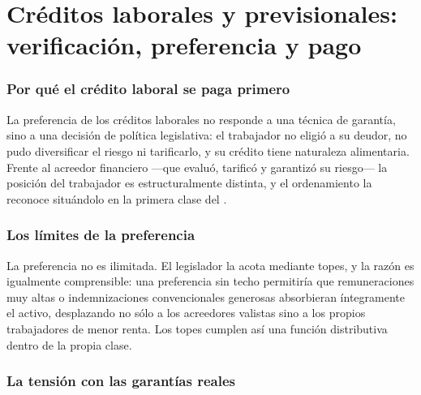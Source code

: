 \chapter{Créditos laborales y previsionales: verificación, preferencia y pago}
\label{cap:creditos-laborales}


\bloqueTeorico

\subsection{Por qué el crédito laboral se paga primero}

La preferencia de los créditos laborales no responde a una técnica de garantía, sino a
una decisión de política legislativa: el trabajador no eligió a su deudor, no pudo
diversificar el riesgo ni tarificarlo, y su crédito tiene naturaleza alimentaria. Frente
al acreedor financiero ---que evaluó, tarificó y garantizó su riesgo--- la posición del
trabajador es estructuralmente distinta, y el ordenamiento la reconoce situándolo en la
primera clase del  \citeyearpar{codigo-civil}.

\subsection{Los límites de la preferencia}

La preferencia no es ilimitada. El legislador la acota mediante topes, y la razón es
igualmente comprensible: una preferencia sin techo permitiría que remuneraciones muy
altas o indemnizaciones convencionales generosas absorbieran íntegramente el activo,
desplazando no sólo a los acreedores valistas sino a los propios trabajadores de menor
renta. Los topes cumplen así una función distributiva dentro de la propia clase.

\subsection{La tensión con las garantías reales}

